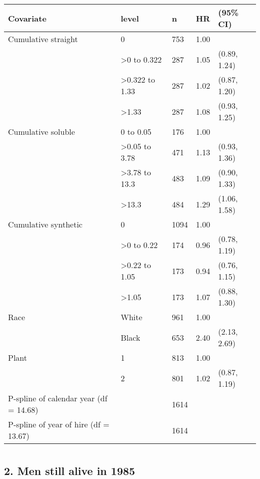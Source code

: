 \documentclass[10pt,]{article}
\begin{document}
\begin{table}[H]
\centering
\begin{tabular}{lllll}
  \toprule
Covariate & level & n & HR & (95\% CI) \\ 
  \midrule
Cumulative straight & 0 & 753 & 1.00 &  \\ 
   & >0 to 0.322 & 287 & 1.05 & (0.89, 1.24) \\ 
   & >0.322 to 1.33 & 287 & 1.02 & (0.87, 1.20) \\ 
   & >1.33 & 287 & 1.08 & (0.93, 1.25) \\ 
  Cumulative soluble & 0 to 0.05 & 176 & 1.00 &  \\ 
   & >0.05 to 3.78 & 471 & 1.13 & (0.93, 1.36) \\ 
   & >3.78 to 13.3 & 483 & 1.09 & (0.90, 1.33) \\ 
   & >13.3 & 484 & 1.29 & (1.06, 1.58) \\ 
  Cumulative synthetic & 0 & 1094 & 1.00 &  \\ 
   & >0 to 0.22 & 174 & 0.96 & (0.78, 1.19) \\ 
   & >0.22 to 1.05 & 173 & 0.94 & (0.76, 1.15) \\ 
   & >1.05 & 173 & 1.07 & (0.88, 1.30) \\ 
  Race & White & 961 & 1.00 &  \\ 
   & Black & 653 & 2.40 & (2.13, 2.69) \\ 
  Plant & 1 & 813 & 1.00 &  \\ 
   & 2 & 801 & 1.02 & (0.87, 1.19) \\ 
  P-spline of calendar year (df = 14.68) &  & 1614 &  &  \\ 
  P-spline of year of hire (df = 13.67) &  & 1614 &  &  \\ 
   \bottomrule
\end{tabular}
\end{table}

\hypertarget{section-4}{%
\section{}\label{section-4}}

\hypertarget{men-still-alive-in-1985}{%
\subsection{2. Men still alive in 1985}\label{men-still-alive-in-1985}}
\end{document}
